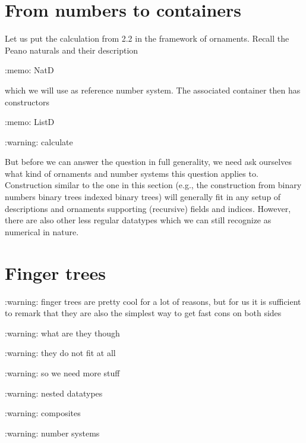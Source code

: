 \section{From numbers to containers}\label{sec:numrep}
\begin{outline}
Let us put the calculation from 2.2 in the framework of ornaments. Recall the Peano naturals \bN and their description

:memo: NatD

which we will use as reference number system. The associated container then has constructors

:memo: ListD

:warning: calculate

But before we can answer the question in full generality, we need ask ourselves what kind of ornaments and number systems this question applies to. Construction similar to the one in this section (e.g., the construction from binary numbers \to binary trees \to indexed binary trees) will generally fit in any setup of descriptions and ornaments supporting (recursive) fields and indices. However, there are also other less regular datatypes which we can still recognize as numerical in nature.
\end{outline}


\section{Finger trees}
\begin{outline}
:warning: finger trees are pretty cool for a lot of reasons, but for us it is sufficient to remark that they are also the simplest way to get fast cons on both sides

:warning: what are they though

:warning: they do not fit at all

:warning: so we need more stuff

:warning: nested datatypes

:warning: composites

:warning: number systems
\end{outline}

